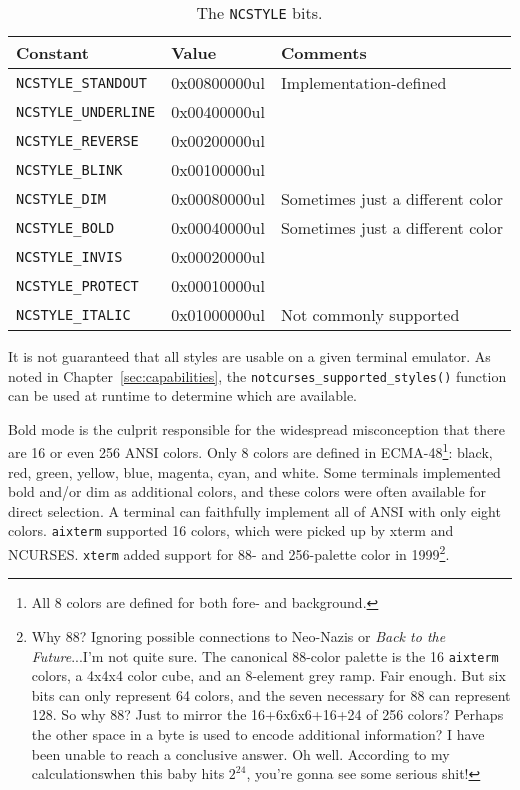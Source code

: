\begin{table}[!htb]
  \centering
  \begin{tabular}{|l|l|l|}
    \hline
    Constant & Value & Comments \\
    \hline
    \hline
\texttt{NCSTYLE\_STANDOUT} &  0x00800000ul & Implementation-defined \\
\texttt{NCSTYLE\_UNDERLINE} & 0x00400000ul & \\
\texttt{NCSTYLE\_REVERSE} &   0x00200000ul & \\
\texttt{NCSTYLE\_BLINK} &     0x00100000ul & \\
\texttt{NCSTYLE\_DIM} &       0x00080000ul & Sometimes just a different color \\
\texttt{NCSTYLE\_BOLD} &      0x00040000ul & Sometimes just a different color \\
\texttt{NCSTYLE\_INVIS} &     0x00020000ul & \\
\texttt{NCSTYLE\_PROTECT} &   0x00010000ul & \\
\texttt{NCSTYLE\_ITALIC} &    0x01000000ul & Not commonly supported \\
    \hline
  \end{tabular}
  \caption{The \texttt{NCSTYLE} bits.}
  \label{table:styles}
\end{table}

It is not guaranteed that all styles are usable on a given terminal emulator.
As noted in Chapter~\ref{sec:capabilities}, the \texttt{notcurses\_supported\_styles()}
function can be used at runtime to determine which are available. 

Bold mode is the culprit responsible for the widespread misconception that there
are 16 or even 256 ANSI colors. Only 8 colors are defined in
ECMA-48\footnote{All 8 colors are defined for both fore- and background.}:
black, red, green, yellow, blue, magenta, cyan, and white. Some terminals
implemented bold and/or dim as additional colors, and these colors were often
available for direct selection. A terminal can faithfully implement all of ANSI
with only eight colors. \texttt{aixterm} supported 16 colors, which were
picked up by xterm and NCURSES. \texttt{xterm} added support for 88- and 256-palette
color in 1999\footnote{Why 88? Ignoring
possible connections to Neo-Nazis or \textit{Back to the Future}...I'm not quite
sure. The canonical 88-color palette is the 16 \texttt{aixterm} colors, a 4x4x4
color cube, and an 8-element grey ramp. Fair enough. But six bits can only represent
64 colors, and the seven necessary for 88 can represent 128. So why 88? Just to
mirror the 16+6x6x6+16+24 of 256 colors? Perhaps the other space in a byte is
used to encode additional information? I have been unable to reach a conclusive
answer. Oh well. According to my calculations\textellipsis when this baby hits $2^{24}$,
you're gonna see some serious shit!}.

